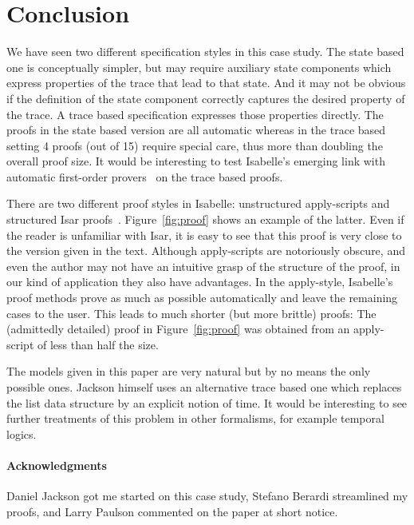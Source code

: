 \section{Conclusion}

We have seen two different specification styles in this case study.
The state based one is conceptually simpler, but may require auxiliary
state components which express properties of the trace that lead to
that state. And it may not be obvious if the definition of the state
component correctly captures the desired property of the trace. A
trace based specification expresses those properties directly.  The
proofs in the state based version are all automatic whereas in the
trace based setting 4 proofs (out of 15) require special care,
thus more than doubling the overall proof size. It would be interesting
to test Isabelle's emerging link with automatic first-order
provers~\cite{MengQP-IC} on the trace based proofs.

There are two different proof styles in Isabelle: unstructured apply-scripts
\cite{LNCS2283} and structured Isar proofs~\cite{Wenzel-PhD,Nipkow-TYPES02}.
Figure~\ref{fig:proof} shows an example of the latter. Even if the
reader is unfamiliar with Isar, it is easy to see that this proof is
very close to the version given in the text. Although apply-scripts
are notoriously obscure, and even the author may not have an intuitive
grasp of the structure of the proof, in our kind of application they
also have advantages. In the apply-style, Isabelle's proof methods
prove as much as possible automatically and leave the remaining cases
to the user. This leads to much shorter (but more brittle) proofs: The
(admittedly detailed) proof in Figure~\ref{fig:proof} was obtained
from an apply-script of less than half the size.

The models given in this paper are very natural but by no means the
only possible ones. Jackson himself uses an alternative trace based
one which replaces the list data structure by an explicit notion of
time. It would be interesting to see further treatments of this problem
in other formalisms, for example temporal logics.

\paragraph{Acknowledgments}
Daniel Jackson got me started on this case study,
Stefano Berardi streamlined my proofs,
and Larry Paulson commented on the paper at short notice.